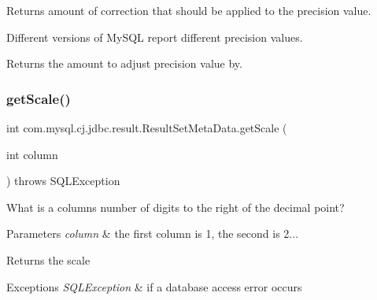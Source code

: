 Returns amount of correction that should be applied to the precision value.

Different versions of My\+S\+QL report different precision values.

\begin{DoxyReturn}{Returns}
the amount to adjust precision value by. 
\end{DoxyReturn}
\mbox{\label{classcom_1_1mysql_1_1cj_1_1jdbc_1_1result_1_1_result_set_meta_data_aca119b251bf316c2191439a84970b275}} 
\subsubsection{\texorpdfstring{get\+Scale()}{getScale()}}
{\footnotesize\ttfamily int com.\+mysql.\+cj.\+jdbc.\+result.\+Result\+Set\+Meta\+Data.\+get\+Scale (\begin{DoxyParamCaption}\item[{int}]{column }\end{DoxyParamCaption}) throws S\+Q\+L\+Exception}

What is a column\textquotesingle{}s number of digits to the right of the decimal point?


\begin{DoxyParams}{Parameters}
{\em column} & the first column is 1, the second is 2...\\
\hline
\end{DoxyParams}
\begin{DoxyReturn}{Returns}
the scale
\end{DoxyReturn}

\begin{DoxyExceptions}{Exceptions}
{\em S\+Q\+L\+Exception} & if a database access error occurs \\
\hline
\end{DoxyExceptions}
\mbox{\label{classcom_1_1mysql_1_1cj_1_1jdbc_1_1result_1_1_result_set_meta_data_a380d616e49af1311581c0e5ac51383a7}} 
